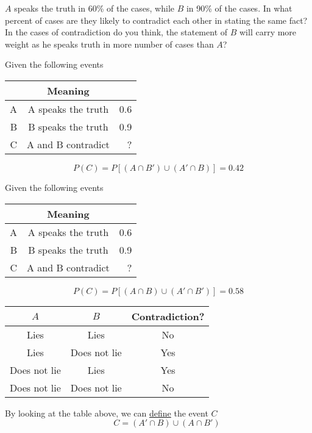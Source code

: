 \documentclass[14pt,fleqn]{extarticle}
\begin{document}
$A$ speaks the truth in 60\% of the cases, while 
$B$ in 90\% of the cases. In what percent of cases 
are they likely to contradict each other in stating 
the same fact? In the cases of contradiction do 
you think, the statement of $B$ will carry more 
weight as he speaks truth in more number of 
cases than $A$? 
%

\newcard

Given the following events 
%
\begin{center}
\begin{tabular}{NcN}
\midrule
{} & Meaning &  \\ 
\midrule 
A & A speaks the truth & 0.6 \\
\midrule
B & B speaks the truth & 0.9 \\ 
\midrule 
C & A and B contradict & ? \\
\midrule 
\end{tabular}
\end{center} 
%
\[ P(C) = P \left[\left(A\cap B' \right) \cup \left(A'\cap B \right)\right] = 0.42 \]

\newcard

Given the following events 
%
\begin{center}
\begin{tabular}{NcN}
\midrule
{} & Meaning &  \\ 
\midrule 
A & A speaks the truth & 0.6 \\
\midrule
B & B speaks the truth & 0.9 \\ 
\midrule 
C & A and B contradict & ? \\
\midrule 
\end{tabular}
\end{center} 
%
\[ P(C) = P \left[\left(A\cap B \right) \cup \left(A'\cap B' \right)\right] = 0.58 \]


\newcard

\begin{center}
  \begin{tabular}{ccc}
   \toprule
        $A$& $B$ & Contradiction? \\
   \midrule
   Lies & Lies & No \\ 
    \midrule 
    Lies & Does not lie & Yes \\ 
    \midrule 
    Does not lie & Lies & Yes \\
    \midrule 
    Does not lie & Does not lie & No \\
    \bottomrule
  \end{tabular}
\end{center}
By looking at the table above, we can \underline{define}  the event $C$ 
\[ \qquad C = \left(A'\cap B \right) \cup \left(A\cap B' \right)\]
\end{document}
